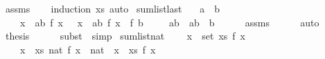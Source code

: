 \begin{isabellebody}
%
\isatagproof
{}\isamarkupfalse%
\ assms\isanewline
\ \ \isamarkupfalse%
\ {\isacharparenleft}induction\ xs{\isacharcomma}\ auto{\isacharparenright}%
\endisatagproof
{\isafoldproof}%
%
\isadelimproof
\isanewline
%
\endisadelimproof
\isanewline
{}\isamarkupfalse%
\ sum{\isacharunderscore}list{\isacharunderscore}last{\isacharcolon}\isanewline
\ \ \ {\isachardoublequoteopen}a\ {\isasymle}\ b{\isachardoublequoteclose}\isanewline
\ \ \ {\isachardoublequoteopen}{\isacharparenleft}{\isasymSum}\ x\ {\isasymleftarrow}\ {\isacharbrackleft}a{\isachardot}{\isachardot}{\isacharless}b{\isacharplus}{}{\isacharbrackright}{\isachardot}\ f\ x{\isacharparenright}\ {\isacharequal}\ {\isacharparenleft}{\isasymSum}\ x\ {\isasymleftarrow}\ {\isacharbrackleft}a{\isachardot}{\isachardot}{\isacharless}b{\isacharbrackright}{\isachardot}\ f\ x{\isacharparenright}\ {\isacharplus}\ f\ b{\isachardoublequoteclose}\isanewline
%
\isadelimproof
%
\endisadelimproof
%
\isatagproof
{}\isamarkupfalse%
{\isacharminus}\isanewline
\ \ \isamarkupfalse%
\ {\isacharasterisk}{\isacharcolon}\ {\isachardoublequoteopen}{\isacharbrackleft}a{\isachardot}{\isachardot}{\isacharless}b{\isacharplus}{}{\isacharbrackright}\ {\isacharequal}\ {\isacharbrackleft}a{\isachardot}{\isachardot}{\isacharless}b{\isacharbrackright}\ {\isacharat}\ {\isacharbrackleft}b{\isacharbrackright}{\isachardoublequoteclose}\isanewline
\ \ \ \ \isamarkupfalse%
\ assms\isanewline
\ \ \ \ \isamarkupfalse%
\ auto\isanewline
\ \ \isamarkupfalse%
\ {\isacharquery}thesis\isanewline
\ \ \ \ \isamarkupfalse%
\ {\isacharparenleft}subst\ {\isacharasterisk}{\isacharcomma}\ simp{\isacharparenright}\isanewline
{}\isamarkupfalse%
%
\endisatagproof
{\isafoldproof}%
%
\isadelimproof
\isanewline
%
\endisadelimproof
\isanewline
{}\isamarkupfalse%
\ sum{\isacharunderscore}list{\isacharunderscore}nat{\isacharcolon}\isanewline
\ \ \ {\isachardoublequoteopen}{\isasymforall}\ x\ {\isasymin}\ set\ xs{\isachardot}\ f\ x\ {\isasymge}\ {}{\isachardoublequoteclose}\isanewline
\ \ \ {\isachardoublequoteopen}{\isacharparenleft}{\isasymSum}\ x\ {\isasymleftarrow}\ xs{\isachardot}\ nat\ {\isacharparenleft}f\ x{\isacharparenright}{\isacharparenright}\ {\isacharequal}\ {\isacharparenleft}nat\ {\isacharparenleft}{\isasymSum}\ x\ {\isasymleftarrow}\ xs{\isachardot}\ f\ x{\isacharparenright}{\isacharparenright}{\isachardoublequoteclose}\isanewline

\end{isabellebody}
